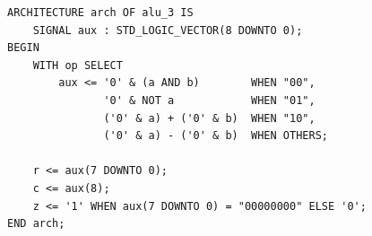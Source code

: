\begin{lstlisting}[caption={Arquitetura do exemplo alu\_3 (aula 6).},label={lst:alu3}]
ARCHITECTURE arch OF alu_3 IS
    SIGNAL aux : STD_LOGIC_VECTOR(8 DOWNTO 0);
BEGIN
    WITH op SELECT
        aux <= '0' & (a AND b)        WHEN "00",
               '0' & NOT a            WHEN "01",
               ('0' & a) + ('0' & b)  WHEN "10",
               ('0' & a) - ('0' & b)  WHEN OTHERS;

    r <= aux(7 DOWNTO 0);
    c <= aux(8);
    z <= '1' WHEN aux(7 DOWNTO 0) = "00000000" ELSE '0';
END arch;
\end{lstlisting}
\vspace{-0.3cm}
